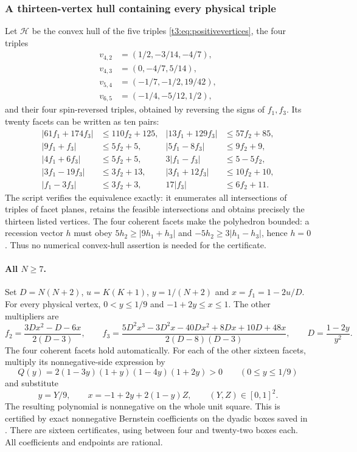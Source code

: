\documentclass[11pt,a4paper]{article}
\begin{document}
\subsubsection{A thirteen-vertex hull containing every physical triple}
Let $\mathcal H$ be the convex hull of the five triples
\eqref{t3:eq:positivevertices}, the four triples
\begin{align*}
 v_{4,2}&=(1/2,-3/14,-4/7),\\
 v_{4,3}&=(0,-4/7,5/14),\\
 v_{5,4}&=(-1/7,-1/2,19/42),\\
 v_{6,5}&=(-1/4,-5/12,1/2),
\end{align*}
and their four spin-reversed triples, obtained by reversing the signs
of $f_1,f_3$. Its twenty facets can be written as ten pairs:
\begin{align*}
 |61f_1+174f_3|&\le110f_2+125,&
 |13f_1+129f_3|&\le57f_2+85,\\
 |9f_1+f_3|&\le5f_2+5,&
 |5f_1-8f_3|&\le9f_2+9,\\
 |4f_1+6f_3|&\le5f_2+5,&
 3|f_1-f_3|&\le5-5f_2,\\
 |3f_1-19f_3|&\le3f_2+13,&
 |3f_1+12f_3|&\le10f_2+10,\\
 |f_1-3f_3|&\le3f_2+3,&
 17|f_3|&\le6f_2+11.
\end{align*}
The script  verifies the equivalence exactly:
it enumerates all intersections of triples of facet planes, retains
the feasible intersections and obtains precisely the thirteen
listed vertices. The four coherent facets make the polyhedron
bounded: a recession vector $h$ must obey
$5h_2\ge|9h_1+h_3|$ and $-5h_2\ge3|h_1-h_3|$, hence $h=0$.
Thus no numerical convex-hull assertion is needed for the certificate.

\paragraph{All $N\ge7$.}
Set $D=N(N+2)$, $u=K(K+1)$, $y=1/(N+2)$ and $x=f_1=1-2u/D$.
For every physical vertex, $0<y\le1/9$ and $-1+2y\le x\le1$.
The other multipliers are
\[
 f_2=\frac{3Dx^2-D-6x}{2(D-3)},\qquad
 f_3=\frac{5D^2x^3-3D^2x-40Dx^2+8Dx+10D+48x}
                  {2(D-8)(D-3)},\qquad D=\frac{1-2y}{y^2}.
\]
The four coherent facets hold automatically. For each of the other
sixteen facets, multiply its nonnegative-side expression by
\[
 Q(y)=2(1-3y)(1+y)(1-4y)(1+2y)>0
           \qquad(0\le y\le1/9)
\]
and substitute
\[
 y=Y/9,\qquad x=-1+2y+2(1-y)Z,
             \qquad (Y,Z)\in[0,1]^2.
\]
The resulting polynomial is nonnegative on the whole unit square.
This is certified by exact nonnegative Bernstein coefficients on
the dyadic boxes saved in .
There are sixteen certificates, using between four and twenty-two
boxes each. All coefficients and endpoints are rational.
\end{document}
